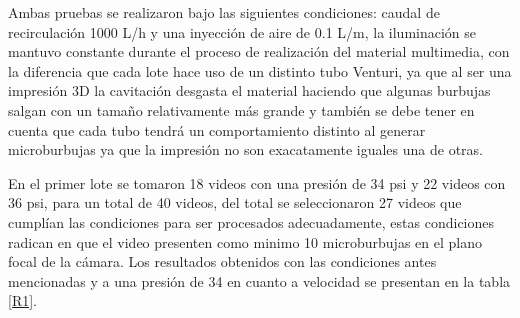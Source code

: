 \documentclass[12pt,twocolumn,a4paper]{article}
\begin{document}
Ambas pruebas se realizaron bajo las siguientes condiciones: caudal de recirculación 1000 L/h y una inyección de aire de 0.1 L/m, la iluminación se mantuvo constante durante el proceso de realización del material multimedia, con la diferencia que cada lote hace uso de un distinto tubo Venturi, ya que al ser una impresión 3D la cavitación desgasta el material haciendo que algunas burbujas salgan con un tamaño relativamente más grande y también se debe tener en cuenta que cada tubo tendrá un comportamiento distinto al generar microburbujas ya que la impresión no son exacatamente iguales una de otras. 

En el primer lote se tomaron 18 videos con una presión de 34 psi y 22 videos con 36 psi, para un total de 40 videos, del total se seleccionaron 27 videos que cumplían las condiciones para ser procesados adecuadamente, estas condiciones radican en que el video presenten como minimo 10 microburbujas en el plano focal de la cámara. Los resultados obtenidos con las condiciones antes mencionadas y a una presión de 34  en cuanto a velocidad se presentan en la tabla \ref{R1}.
\end{document}
